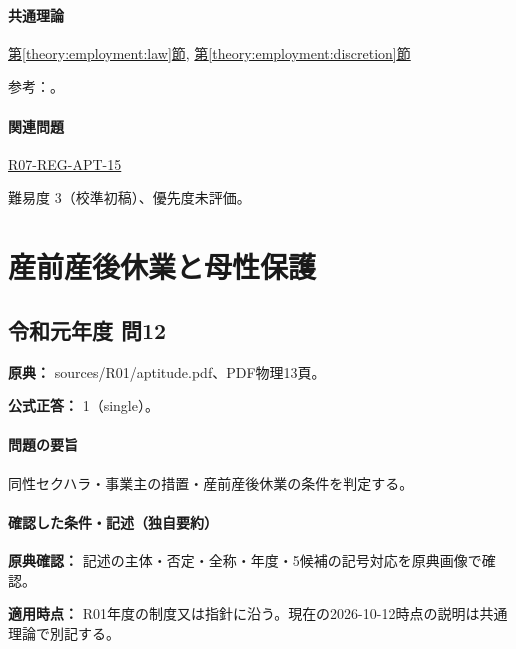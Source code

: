 \paragraph{共通理論} \hyperref[theory:employment:law]{第\ref*{theory:employment:law}節}, \hyperref[theory:employment:discretion]{第\ref*{theory:employment:discretion}節}

\par 参考：\cite{employment_discretion2014,employment_discretion_current,employment_industrial_physician,employment_labor_three,employment_overtime}。

\paragraph{関連問題} \hyperref[q:r07-reg-apt-15]{R07-REG-APT-15}

\par 難易度 3（校準初稿）、優先度未評価。

\section{産前産後休業と母性保護}

\subsection{令和元年度 問12}
\label{q:r01-reg-apt-12}

\noindent\textbf{原典：} sources/R01/aptitude.pdf、PDF物理13頁。

\textbf{公式正答：} 1（single）。

\paragraph{問題の要旨} 同性セクハラ・事業主の措置・産前産後休業の条件を判定する。

\paragraph{確認した条件・記述（独自要約）}\mbox{}\par

\noindent\textbf{原典確認：} 記述の主体・否定・全称・年度・5候補の記号対応を原典画像で確認。\par

\noindent\textbf{適用時点：} R01年度の制度又は指針に沿う。現在の2026-10-12時点の説明は共通理論で別記する。\par

